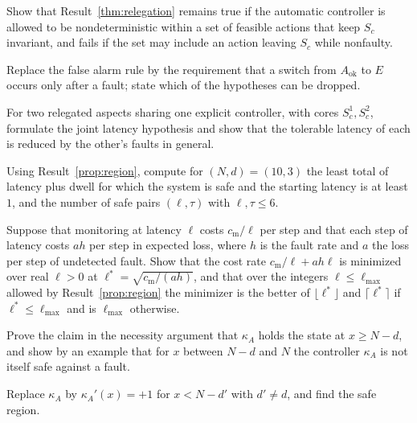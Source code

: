 \begin{exercise}
Show that Result~\ref{thm:relegation} remains true if the automatic controller is allowed to be nondeterministic within a set of feasible actions that keep $S_c$ invariant, and fails if the set may include an action leaving $S_c$ while nonfaulty.
\end{exercise}

\begin{exercise}
Replace the false alarm rule by the requirement that a switch from $A_{\mathrm{ok}}$ to $E$ occurs only after a fault; state which of the hypotheses can be dropped.
\end{exercise}

\begin{exercise}
For two relegated aspects sharing one explicit controller, with cores $S_c^{1},S_c^{2}$, formulate the joint latency hypothesis and show that the tolerable latency of each is reduced by the other's faults in general.
\end{exercise}

\begin{exercise}
Using Result~\ref{prop:region}, compute for $(N,d)=(10,3)$ the least total of latency plus dwell for which the system is safe and the starting latency is at least $1$, and the number of safe pairs $(\ell,\tau)$ with $\ell,\tau\le6$.
\end{exercise}

\begin{exercise}
Suppose that monitoring at latency $\ell$ costs $c_{\mathrm m}/\ell$ per step and that each step of latency costs $a h$ per step in expected loss, where $h$ is the fault rate and $a$ the loss per step of undetected fault. Show that the cost rate $c_{\mathrm m}/\ell+ah\ell$ is minimized over real $\ell>0$ at $\ell^{*}=\sqrt{c_{\mathrm m}/(ah)}$, and that over the integers $\ell\le\ell_{\max}$ allowed by Result~\ref{prop:region} the minimizer is the better of $\lfloor\ell^{*}\rfloor$ and $\lceil\ell^{*}\rceil$ if $\ell^{*}\le\ell_{\max}$ and is $\ell_{\max}$ otherwise.\label{ex2:latency}
\end{exercise}

\begin{exercise}
Prove the claim in the necessity argument that $\kappa_A$ holds the state at $x\ge N-d$, and show by an example that for $x$ between $N-d$ and $N$ the controller $\kappa_A$ is not itself safe against a fault.
\end{exercise}

\begin{exercise}
Replace $\kappa_A$ by $\kappa_A'(x)=+1$ for $x<N-d'$ with $d'\ne d$, and find the safe region.
\end{exercise}

